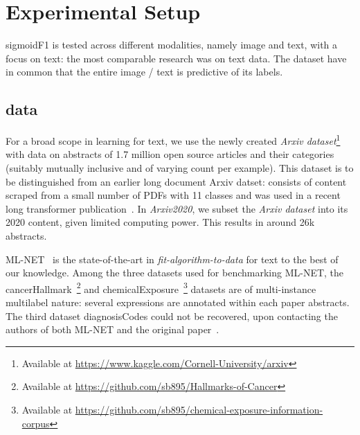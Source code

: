 
\section{Experimental Setup}
\label{sec:orgb44ba25}

sigmoidF1 is tested across different modalities, namely image and text, with a focus on text: the most comparable research was on text data. The dataset have in common that the entire image / text is predictive of its labels.


\subsection{data}


For a broad scope in learning for text, we use the newly created \emph{Arxiv dataset}\footnote{Available at \url{https://www.kaggle.com/Cornell-University/arxiv}} with data on abstracts of 1.7 million open source articles and their categories (suitably mutually inclusive and of varying count per example). This dataset is to be distinguished from an earlier long document Arxiv datset: consists of content scraped from a small number of PDFs with 11 classes \cite{oldArxiv} and was used in a recent long transformer publication~\cite{bigBird}. In \textit{Arxiv2020}, we subset the \emph{Arxiv dataset} into its 2020 content, given limited computing power. This results in around 26k abstracts.


ML-NET~\cite{multitaskLabel} is the state-of-the-art in \emph{fit-algorithm-to-data} for text to the best of our knowledge. Among the three datasets used for benchmarking ML-NET, the cancerHallmark~\cite{cancerHallmarks}\footnote{Available at \url{https://github.com/sb895/Hallmarks-of-Cancer}} and chemicalExposure~\cite{chemExposure}\footnote{Available at \url{https://github.com/sb895/chemical-exposure-information-corpus}} datasets are of multi-instance multilabel nature: several expressions are annotated within each paper abstracts. The third dataset diagnosisCodes could not be recovered, upon contacting the authors of both ML-NET and the original paper~\cite{diagnosisCode}. 

